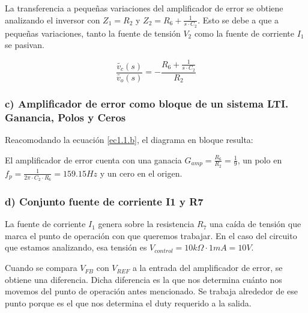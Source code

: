 \documentclass[e4_tp2_main.tex]{subfiles}
\begin{document}
La transferencia a pequeñas variaciones del amplificador de error se obtiene analizando el inversor con $Z_1=R_2$ y $Z_2=R_6 + \frac{1}{s \cdot C_2}$. Esto se debe a que a pequeñas variaciones, tanto la fuente de tensi\'on $V_2$ como la fuente de corriente $I_1$ se pasivan.

\begin{equation}
\frac{\widetilde{v_c}(s)}{\widetilde{v_o}(s)}=-\frac{R_6 + \frac{1}{s \cdot C_2} }{R_2}  \label{ec1.1.b}
\end{equation}

\subsubsection*{c) Amplificador de error como bloque de un sistema LTI. Ganancia, Polos y Ceros}

Reacomodando la ecuaci\'on \eqref{ec1.1.b}, el diagrama en bloque resulta: 

\begin{center}
\end{center}


El amplificador de error cuenta con una ganacia $G_{amp}=\frac{R_6}{R_2} =\frac{1}{9}$, un polo en $f_p=\frac{1}{2 \pi \cdot C_2 \cdot R_6 }=159.15Hz$ y un cero en el origen.


\subsubsection*{d) Conjunto fuente de corriente I1 y R7}
La fuente de corriente $I_1$ genera sobre la resistencia $R_7$ una ca\'ida de tensi\'on que marca el punto de operaci\'on con que queremos trabajar. En el caso del circuito que estamos analizando, esa tensi\'on es $V_{control}=10k\Omega \cdot 1mA =10V$. 

Cuando se compara $V_{FB}$ con $V_{REF}$ a la entrada del amplificador de error, se obtiene una diferencia. Dicha diferencia es la que nos determina cu\'anto nos movemos del punto de operaci\'on antes mencionado. Se trabaja alrededor de ese punto porque es el que nos determina el duty requerido a la salida.
\end{document}
